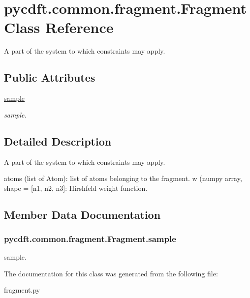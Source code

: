 \hypertarget{classpycdft_1_1common_1_1fragment_1_1Fragment}{\section{pycdft.\-common.\-fragment.\-Fragment Class Reference}
\label{classpycdft_1_1common_1_1fragment_1_1Fragment}
}


A part of the system to which constraints may apply.  


\subsection*{Public Attributes}
\begin{DoxyCompactItemize}
\item 
\hyperlink{classpycdft_1_1common_1_1fragment_1_1Fragment_a8b52da1ef49612cd77c1f6768306751a}{sample}
\begin{DoxyCompactList}\small\item\em sample. \end{DoxyCompactList}\end{DoxyCompactItemize}


\subsection{Detailed Description}
A part of the system to which constraints may apply. 

atoms (list of Atom)\-: list of atoms belonging to the fragment. w (numpy array, shape = \mbox{[}n1, n2, n3\mbox{]}\-: Hirshfeld weight function. 

\subsection{Member Data Documentation}
\hypertarget{classpycdft_1_1common_1_1fragment_1_1Fragment_a8b52da1ef49612cd77c1f6768306751a}{
\subsubsection[{sample}]{\setlength{\rightskip}{0pt plus 5cm}pycdft.\-common.\-fragment.\-Fragment.\-sample}}\label{classpycdft_1_1common_1_1fragment_1_1Fragment_a8b52da1ef49612cd77c1f6768306751a}


sample. 



The documentation for this class was generated from the following file\-:\begin{DoxyCompactItemize}
\item 
fragment.\-py\end{DoxyCompactItemize}
